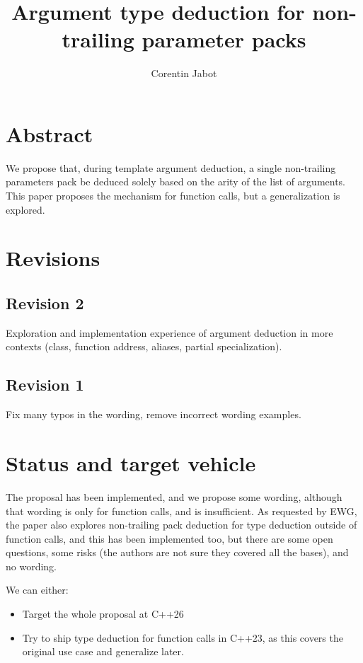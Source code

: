 \documentclass{wg21}
\title{Argument type deduction for non-trailing parameter packs}
\author{Corentin Jabot}{corentin.jabot@gmail.com}
\begin{document}
\maketitle

\section{Abstract}

We propose that, during template argument deduction, a single non-trailing parameters pack be deduced solely based on the arity of the list of arguments.
This paper proposes the mechanism for function calls, but a generalization is explored.


\section{Revisions}

\subsection{Revision 2}

Exploration and implementation experience of argument deduction in more contexts (class, function address, aliases, partial specialization).

\subsection*{Revision 1}
Fix many typos in the wording, remove incorrect wording examples.


\section{Status and target vehicle}

The proposal has been implemented, and we propose some wording, although that wording is only for function calls,
and is insufficient.
As requested by EWG, the paper also explores non-trailing pack deduction for type deduction outside of function calls,
and this has been implemented too, but there are some open questions, some risks (the authors are not sure they covered all the bases),
and no wording.

We can either:
\begin{itemize}
\item Target the whole proposal at C++26
\item Try to ship type deduction for function calls in C++23, as this covers the original  use case and generalize later.
\end{itemize}
\end{document}
